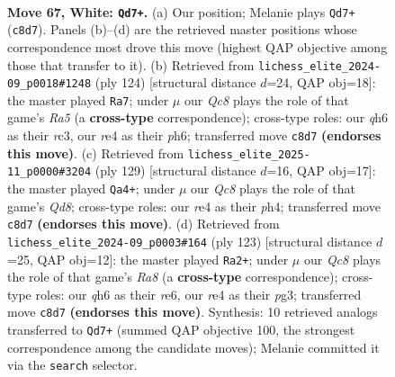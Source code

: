\documentclass[11pt]{article}
\begin{document}
\clearpage

\begin{figure}[p]\centering
\begin{subfigure}{0.46\textwidth}\centering
\resizebox{\linewidth}{!}{%
\newchessgame
\chessboard[
  setfen={2Q5/5k2/5p1q/3p4/4r3/6P1/6KP/8 w - - 14 67},
  showmover=false,
  pgfstyle=straightmove, color=movearrow, markmove={c8-d7}
]}
\caption{}
\end{subfigure}\hfill
\begin{subfigure}{0.46\textwidth}\centering
\resizebox{\linewidth}{!}{%
\newchessgame
\chessboard[
  setfen={8/6p1/7p/R7/4pk2/2r4P/6P1/5K2 w - - 16 63},
  showmover=false,
  pgfstyle=straightmove, color=movearrow, markmove={a5-a7}
]}
\caption{}
\end{subfigure}
\\[4pt]
\begin{subfigure}{0.46\textwidth}\centering
\resizebox{\linewidth}{!}{%
\newchessgame
\chessboard[
  setfen={8/7k/KP4p1/4Q2p/5P1P/8/8/3q4 b - - 8 65},
  showmover=false,
  pgfstyle=straightmove, color=movearrow, markmove={d1-a4}
]}
\caption{}
\end{subfigure}\hfill
\begin{subfigure}{0.46\textwidth}\centering
\resizebox{\linewidth}{!}{%
\newchessgame
\chessboard[
  setfen={8/8/4R3/5pk1/4p3/6P1/4KP2/r7 b - - 22 62},
  showmover=false,
  pgfstyle=straightmove, color=movearrow, markmove={a1-a2}
]}
\caption{}
\end{subfigure}
\caption{\textbf{Move 67, White: \texttt{Qd7+}.} (a) Our position; Melanie plays \texttt{Qd7+} (\texttt{c8d7}). Panels (b)--(d) are the retrieved master positions whose correspondence most drove this move (highest QAP objective among those that transfer to it). (b) Retrieved from \texttt{lichess\_elite\_2024-09\_p0018\#1248} (ply 124) [structural distance $d$=24, QAP obj=18]: the master played \texttt{Ra7}; under $\mu$ our \emph{Qc8} plays the role of that game's \emph{Ra5} (a \textbf{cross-type} correspondence); cross-type roles: our \emph{q}h6 as their \emph{r}c3, our \emph{r}e4 as their \emph{p}h6; transferred move \texttt{c8d7} \textbf{(endorses this move)}. (c) Retrieved from \texttt{lichess\_elite\_2025-11\_p0000\#3204} (ply 129) [structural distance $d$=16, QAP obj=17]: the master played \texttt{Qa4+}; under $\mu$ our \emph{Qc8} plays the role of that game's \emph{Qd8}; cross-type roles: our \emph{r}e4 as their \emph{p}h4; transferred move \texttt{c8d7} \textbf{(endorses this move)}. (d) Retrieved from \texttt{lichess\_elite\_2024-09\_p0003\#164} (ply 123) [structural distance $d$=25, QAP obj=12]: the master played \texttt{Ra2+}; under $\mu$ our \emph{Qc8} plays the role of that game's \emph{Ra8} (a \textbf{cross-type} correspondence); cross-type roles: our \emph{q}h6 as their \emph{r}e6, our \emph{r}e4 as their \emph{p}g3; transferred move \texttt{c8d7} \textbf{(endorses this move)}. Synthesis: 10 retrieved analogs transferred to \texttt{Qd7+} (summed QAP objective 100, the strongest correspondence among the candidate moves); Melanie committed it via the \texttt{search} selector.}
\label{fig:thought-m132}
\end{figure}
\end{document}
